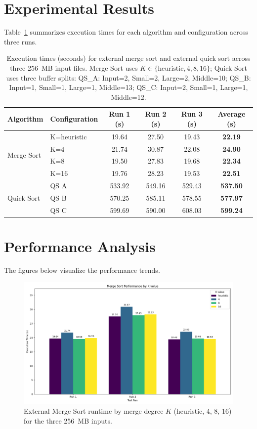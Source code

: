 \documentclass{article}
\begin{document}
\section*{Experimental Results}
Table~\ref{tab:perf_summary} summarizes execution times for each algorithm and configuration across three runs.

\begin{table}[h!]
\centering
\begin{tabular}{l l c c c c}
\toprule
\textbf{Algorithm} & \textbf{Configuration} & \textbf{Run 1 (s)} & \textbf{Run 2 (s)} & \textbf{Run 3 (s)} & \textbf{Average (s)} \\
\midrule
\multirow{4}{*}{Merge Sort} & K=heuristic & 19.64 & 27.50 & 19.43 & \textbf{22.19} \\
& K=4 & 21.74 & 30.87 & 22.08 & \textbf{24.90} \\
& K=8 & 19.50 & 27.83 & 19.68 & \textbf{22.34} \\
& K=16 & 19.76 & 28.23 & 19.53 & \textbf{22.51} \\
\midrule
\multirow{3}{*}{Quick Sort} & QS A & 533.92 & 549.16 & 529.43 & \textbf{537.50} \\
& QS B & 570.25 & 585.11 & 578.55 & \textbf{577.97} \\
& QS C & 599.69 & 590.00 & 608.03 & \textbf{599.24} \\
\bottomrule
\end{tabular}
\caption{Execution times (seconds) for external merge sort and external quick sort across three 256~MB input files. Merge Sort uses \(K\in\{\text{heuristic},4,8,16\}\); Quick Sort uses three buffer splits: QS\_A: Input=2, Small=2, Large=2, Middle=10; QS\_B: Input=1, Small=1, Large=1, Middle=13; QS\_C: Input=2, Small=1, Large=1, Middle=12.}
\label{tab:perf_summary}
\end{table}

\section*{Performance Analysis}
The figures below visualize the performance trends.

\begin{figure}[h!]
\centering
\includegraphics[width=\textwidth]{figures/merge_sort_time.png}
\caption{External Merge Sort runtime by merge degree $K$ (heuristic, 4, 8, 16) for the three 256~MB inputs.}
\label{fig:merge_sort_k_comparison}
\end{figure}
\end{document}

